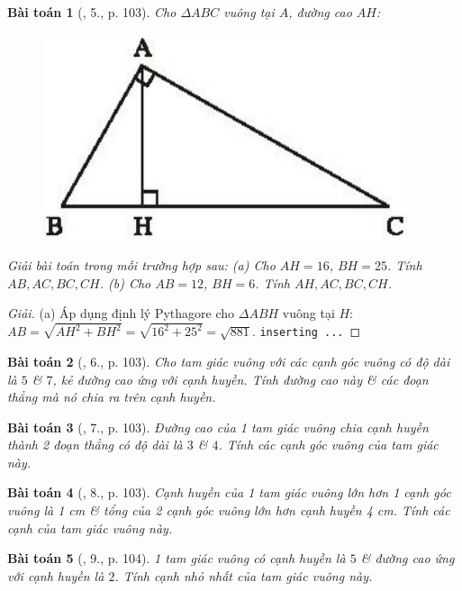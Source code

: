 \documentclass{article}
\newtheorem{baitoan}{Bài toán}
\begin{document}
\begin{baitoan}[\cite{SBT_Toan_9_tap_1}, 5., p. 103]
	Cho $\Delta ABC$ vuông tại $A$, đường cao $AH$:
	\begin{figure}[H]
		\centering
		\includegraphics[scale=.25]{SBT_Toan_9_5_p103}
	\end{figure}
	\noindent Giải bài toán trong mỗi trường hợp sau: (a) Cho $AH = 16$, $BH = 25$. Tính $AB,AC,BC,CH$. (b) Cho $AB = 12$, $BH = 6$. Tính $AH,AC,BC,CH$.
\end{baitoan}

\begin{proof}[Giải]
	(a) Áp dụng định lý Pythagore cho $\Delta ABH$ vuông tại $H$: $AB = \sqrt{AH^2 + BH^2} = \sqrt{16^2 + 25^2} = \sqrt{881}$. \texttt{inserting ...}
\end{proof}

\begin{baitoan}[\cite{SBT_Toan_9_tap_1}, 6., p. 103]
	Cho tam giác vuông với các cạnh góc vuông có độ dài là $5$ \& $7$, kẻ đường cao ứng với cạnh huyền. Tính đường cao này \& các đoạn thẳng mà nó chia ra trên cạnh huyền.
\end{baitoan}

\begin{baitoan}[\cite{SBT_Toan_9_tap_1}, 7., p. 103]
	Đường cao của 1 tam giác vuông chia cạnh huyền thành 2 đoạn thẳng có độ dài là $3$ \& $4$. Tính các cạnh góc vuông của tam giác này.
\end{baitoan}

\begin{baitoan}[\cite{SBT_Toan_9_tap_1}, 8., p. 103]
	Cạnh huyền của 1 tam giác vuông lớn hơn 1 cạnh góc vuông là {\rm1 cm} \& tổng của 2 cạnh góc vuông lớn hơn cạnh huyền {\rm4 cm}. Tính các cạnh của tam giác vuông này.
\end{baitoan}

\begin{baitoan}[\cite{SBT_Toan_9_tap_1}, 9., p. 104]
	1 tam giác vuông có cạnh huyền là $5$ \& đường cao ứng với cạnh huyền là $2$. Tính cạnh nhỏ nhất của tam giác vuông này.
\end{baitoan}
\end{document}
